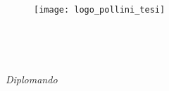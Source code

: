 
\begin{titlepage}

\begin{center}


\vspace{10pt}
\begin{figure}[htbp]
\begin{center}
\texttt{[image: logo\_pollini\_tesi]}
\end{center}
\end{figure}
\vspace{10pt} 


\begin{large}
\textsc{\myFaculty}\\
\end{large}


\begin{LARGE}
\begin{center}
\textbf{\myTitle}\\
\end{center}
\end{LARGE}

\vspace{10pt} 

\begin{large}

\noindent \textsl{\DCPL}

\end{large}

\vspace{10pt} 

\begin{large}

\begin{flushleft}
\textit{Diplomando}\\ 
\myName
\end{flushleft}


\end{large}
\end{center}
\end{titlepage}
